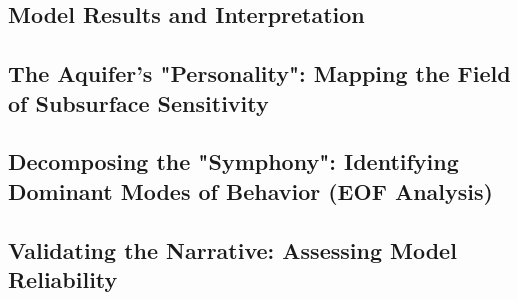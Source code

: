 \subsection{Model Results and Interpretation}

\subsection{The Aquifer's "Personality": Mapping the Field of Subsurface Sensitivity }

\subsection{Decomposing the "Symphony": Identifying Dominant Modes of Behavior (EOF Analysis)}

\subsection{Validating the Narrative: Assessing Model Reliability}